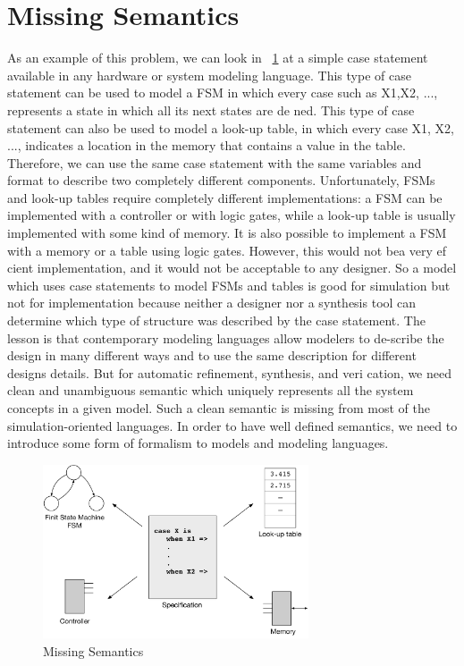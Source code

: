 

\section{Missing Semantics}

As an example of this problem, we can look in ~\ref{fig:missing_semantics} at a simple case statement available in any hardware or system modeling language.
This type of case statement can be used to model a FSM in which every case such as X1,X2, ..., represents a state in which all its next states are de ned.
This type of case statement can also be used to model a look-up table, in which every case X1, X2, ..., indicates a location in the memory that contains a value in the table.
Therefore,  we can use the same case statement with the same variables  and format to describe two completely different components.
Unfortunately, FSMs and look-up tables require completely different implementations:  a FSM can be implemented with a controller or with logic gates, while a look-up table is usually implemented with some kind of memory.
It is also possible to implement a FSM with a memory or a table using logic gates.
However, this would not bea very ef cient implementation, and it would not be acceptable to any designer.
So a model which uses case statements to model FSMs and tables is good for simulation but not for implementation because neither a designer nor a synthesis tool can determine which type of structure was described by the case statement.
The lesson is that contemporary modeling languages allow modelers to de-scribe the design in many different ways and to use the same description for different designs details. But for automatic refinement, synthesis, and veri cation, we need clean and unambiguous semantic which uniquely represents all the system concepts in a given model.  Such a clean semantic is missing from most of the simulation-oriented  languages.
In order to have well defined semantics, we need to introduce some form of formalism to models and modeling languages.


\begin{figure}[h]
    \centering
    \includegraphics[width=0.7\textwidth]{figures/Introduction/Missing_Semantics.pdf}
    \caption{Missing Semantics}
    \label{fig:missing_semantics}
\end{figure}


